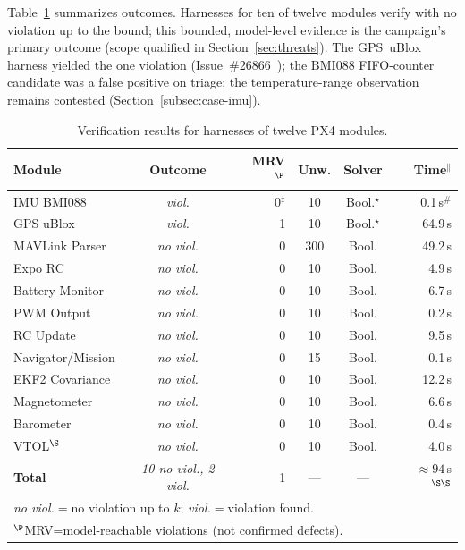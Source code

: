 \documentclass[conference]{IEEEtran}
\begin{document}
Table~\ref{tab:results} summarizes outcomes. Harnesses for ten of twelve modules
verify with no violation up to the bound; this
bounded, model-level evidence is the campaign's primary outcome
(scope qualified in Section~\ref{sec:threats}).
The GPS~uBlox harness yielded the one violation
(Issue~\#26866~\cite{PX4_Issue26866}); the BMI088 FIFO-counter candidate
was a false positive on triage; the
temperature-range observation remains contested
(Section~\ref{subsec:case-imu}).
\begin{table}[t]
\centering
\caption{Verification results for harnesses of twelve PX4 modules.}
\label{tab:results}
\scriptsize
\setlength{\tabcolsep}{3pt}
\begin{tabular}{@{}lcrccr@{}}
\toprule
\textbf{Module} & \textbf{Outcome} & \textbf{MRV}$^\P$ & \textbf{Unw.} & \textbf{Solver} & \textbf{Time}$^\|$\\
\midrule
IMU BMI088        & \textit{viol.} & 0$^\ddagger$ & 10 & Bool.$^\star$ & 0.1\,s$^{\#}$ \\
GPS uBlox         & \textit{viol.} & 1 & 10 & Bool.$^\star$ & 64.9\,s \\
MAVLink Parser    & \textit{no viol.} & 0 & 300 & Bool. & 49.2\,s \\
Expo RC           & \textit{no viol.} & 0 & 10 & Bool. & 4.9\,s \\
Battery Monitor   & \textit{no viol.} & 0 & 10 & Bool. &   6.7\,s \\
PWM Output        & \textit{no viol.} & 0 & 10 & Bool. &   0.2\,s \\
RC Update         & \textit{no viol.} & 0 & 10 & Bool. &  9.5\,s \\
Navigator/Mission & \textit{no viol.} & 0 & 15 & Bool. &   0.1\,s \\
EKF2 Covariance   & \textit{no viol.} & 0 & 10 & Bool. & 12.2\,s \\
Magnetometer      & \textit{no viol.} & 0 & 10 & Bool. &  6.6\,s \\
Barometer         & \textit{no viol.} & 0 & 10 & Bool. &   0.4\,s \\
VTOL$^\S$         & \textit{no viol.} & 0 & 10 & Bool. &  4.0\,s \\
\midrule
\textbf{Total} & \textit{10 no viol., 2 viol.} & 1 & --- & --- & ${\approx}94$\,s$^{\S\S}$ \\
\bottomrule
\multicolumn{6}{l}{\textit{no viol.}$=$no violation up to $k$; \textit{viol.}$=$violation found.}\\
\multicolumn{6}{l}{$^\P$MRV=model-reachable violations (not confirmed defects).}\\

\end{tabular}
\end{table}
\end{document}

